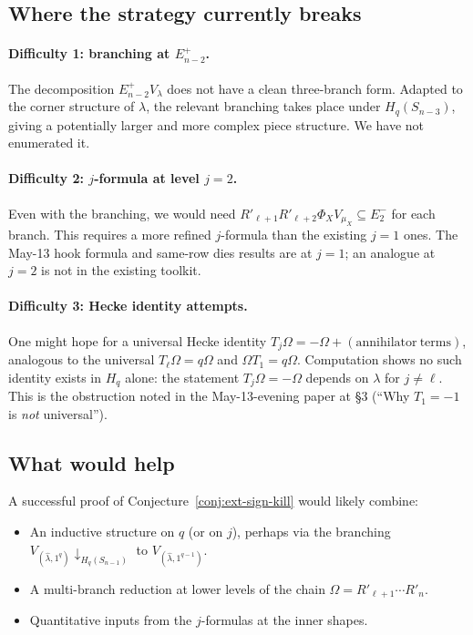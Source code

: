 \documentclass[11pt]{article}
\theoremstyle{definition}
\newcommand{\Hq}{H_q}
\newcommand{\Vlam}{V_\lambda}
\newcommand{\Om}{\Omega}
\newcommand{\hatl}{\widehat\lambda}
\begin{document}
\subsection{Where the strategy currently breaks}

\paragraph{Difficulty 1: branching at $E_{n-2}^+$.}  The decomposition
$E_{n-2}^+ \Vlam$ does not have a clean three-branch form.  Adapted
to the corner structure of $\lambda$, the relevant branching takes
place under $H_q(S_{n-3})$, giving a potentially larger and more
complex piece structure.  We have not enumerated it.

\paragraph{Difficulty 2: $j$-formula at level $j = 2$.}  Even with the
branching, we would need $R'_{\ell+1} R'_{\ell+2} \Phi_X V_{\mu_X}
\subseteq E_2^-$ for each branch.  This requires a more refined
$j$-formula than the existing $j = 1$ ones.  The May-13 hook
formula and same-row dies results are at $j = 1$; an analogue at
$j = 2$ is not in the existing toolkit.

\paragraph{Difficulty 3: Hecke identity attempts.}  One might hope for a
universal Hecke identity $T_j \Om = -\Om + \mathrm{(annihilator\
terms)}$, analogous to the universal $T_\ell \Om = q \Om$ and
$\Om T_1 = q \Om$.  Computation shows no such identity exists in
$\Hq$ alone: the statement $T_j \Om = -\Om$ depends on $\lambda$ for
$j \ne \ell$.  This is the obstruction noted in the May-13-evening
paper at \S 3 (``Why $T_1 = -1$ is \emph{not} universal'').

\subsection{What would help}

A successful proof of Conjecture~\ref{conj:ext-sign-kill} would
likely combine:
\begin{itemize}[topsep=0.2em,itemsep=0.1em]
\item An inductive structure on $q$ (or on $j$), perhaps via the
branching $V_{(\hatl, 1^q)} \!\downarrow_{H_q(S_{n-1})}$ to
$V_{(\hatl, 1^{q-1})}$.
\item A multi-branch reduction at lower levels of the chain
$\Om = R'_{\ell+1} \cdots R'_n$.
\item Quantitative inputs from the $j$-formulas at the inner shapes.
\end{itemize}
\end{document}
